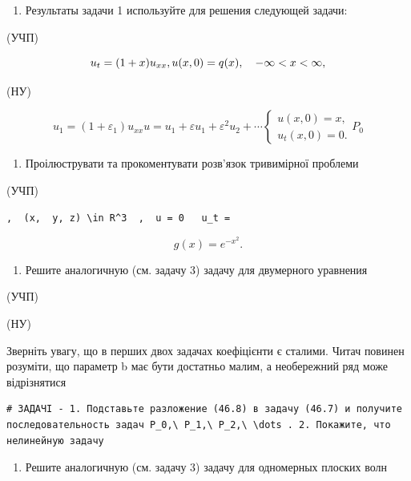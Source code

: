 \documentclass[
  ukrainian,
]{article}
\providecommand{\tightlist}{%
  \setlength{\itemsep}{0pt}\setlength{\parskip}{0pt}}
\begin{document}
\begin{enumerate}
\def\labelenumi{\arabic{enumi}.}
\setcounter{enumi}{1}
\tightlist
\item
  Результаты задачи 1 используйте для решения следующей задачи:
\end{enumerate}

(УЧП)

\[
u_t = (1+x) u_{xx}, \\ u(x, 0) = q(x), \quad -\infty < x < \infty,
\]

(НУ)

\[
u_1 = (1 + \varepsilon_1) u_{xx}
u = u_1 + \varepsilon u_1 + \varepsilon^2 u_2 + \cdots
\begin{cases} u(x, 0) = x, \\ u_t(x, 0) = 0. \end{cases}
P_{0}
\]

\begin{enumerate}
\def\labelenumi{\arabic{enumi}.}
\setcounter{enumi}{2}
\tightlist
\item
  Проілюструвати та прокоментувати розв'язок тривимірної проблеми
\end{enumerate}

(УЧП)

\begin{verbatim}
,  (x,  y, z) \in R^3  ,  u = 0   u_t =
\end{verbatim}

\[
g(x) = e^{-x^2}.
\]

\begin{enumerate}
\def\labelenumi{\arabic{enumi}.}
\setcounter{enumi}{3}
\tightlist
\item
  Решите аналогичную (см. задачу 3) задачу для двумерного уравнения
\end{enumerate}

(УЧП)

(НУ)

Зверніть увагу, що в перших двох задачах коефіцієнти є сталими. Читач
повинен розуміти, що параметр b має бути достатньо малим, а необережний
ряд може відрізнятися

\begin{verbatim}
# ЗАДАЧІ - 1. Подставьте разложение (46.8) в задачу (46.7) и получите последовательность задач P_0,\ P_1,\ P_2,\ \dots . 2. Покажите, что нелинейную задачу
\end{verbatim}

\begin{enumerate}
\def\labelenumi{\arabic{enumi}.}
\setcounter{enumi}{4}
\tightlist
\item
  Решите аналогичную (см. задачу 3) задачу для одномерных плоских волн
\end{enumerate}
\end{document}
